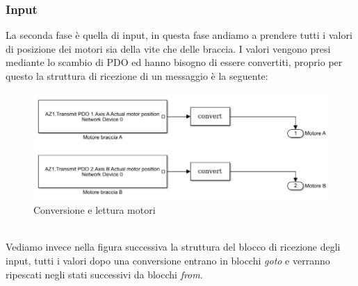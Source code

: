\subsubsection*{Input}
La seconda fase è quella di input, in questa fase andiamo a prendere tutti i valori di posizione dei motori sia della vite che delle braccia. I valori vengono presi mediante lo scambio di PDO ed hanno bisogno di essere convertiti, proprio per questo la struttura di ricezione di un messaggio è la seguente: 
\begin{figure}[ht]
	\begin{center}
		\includegraphics[scale=0.6]{Immagini/Sperimentale/convertS}
		\caption{Conversione e lettura motori}
		\label{fig:MotorConversion}
	\end{center}
\end{figure}
\\Vediamo invece nella figura successiva la struttura del blocco di ricezione degli input, tutti i valori dopo una conversione entrano in blocchi \textit{goto} e verranno ripescati negli stati successivi da blocchi \textit{from}.
